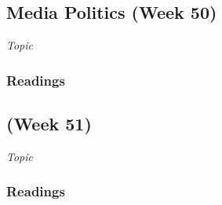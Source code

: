 \documentclass[12pt,a4paper]{article}
\begin{document}



\clearpage
\subsection{Media Politics (Week 50)}
\emph{Topic}
\vspace{1em}
\subsubsection*{Readings}



\clearpage
\subsection{ (Week 51)}
\emph{Topic}
\vspace{1em}
\subsubsection*{Readings}




\end{document}
